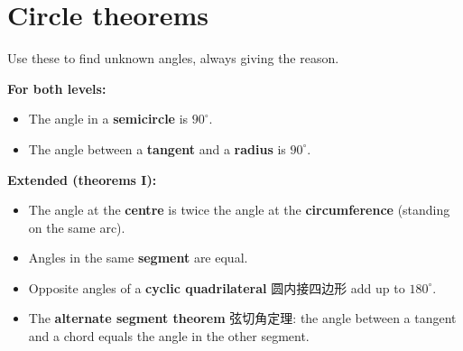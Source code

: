 \documentclass[11pt]{article}
\begin{document}
\begin{center}
\end{center}

\section*{Circle theorems}

Use these to find unknown angles, always giving the reason.

\textbf{For both levels:}

\begin{itemize}
\item The angle in a \textbf{semicircle} is $90^{\circ}$.

\item The angle between a \textbf{tangent} and a \textbf{radius} is $90^{\circ}$.

\end{itemize}

\textbf{Extended (theorems I):}

\begin{itemize}
\item The angle at the \textbf{centre} is twice the angle at the \textbf{circumference} (standing on the same arc).

\item Angles in the same \textbf{segment} are equal.

\item Opposite angles of a \textbf{cyclic quadrilateral} 圆内接四边形 add up to $180^{\circ}$.

\item The \textbf{alternate segment theorem} 弦切角定理: the angle between a tangent and a chord equals the angle in the other segment.

\end{itemize}
\end{document}
